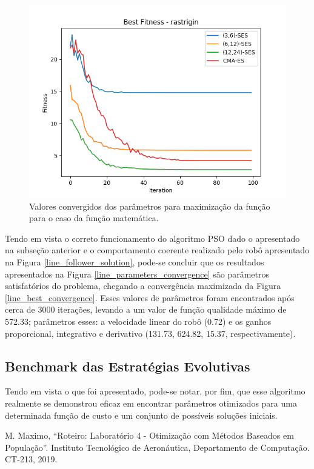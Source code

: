 \documentclass[conference]{IEEEtran}
\begin{document}
\begin{figure}[htbp]
\centering
\centerline{\includegraphics[scale=0.4]{imagens/rastrigin/best_fitness.png}}
\caption{Valores convergidos dos parâmetros para maximização da função para o caso da função matemática.}
\label{rastrigin/best_fitness}
\end{figure}

Tendo em vista o correto funcionamento do algoritmo PSO dado o apresentado na subseção anterior e o comportamento coerente realizado pelo robô apresentado na Figura \ref{line_follower_solution}, pode-se concluir que os resultados apresentados na Figura \ref{line_parameters_convergence} são parâmetros satisfatórios do problema, chegando a convergência maximizada da Figura \ref{line_best_convergence}. Esses valores de parâmetros foram encontrados após cerca de 3000 iterações, levando a um valor de função qualidade máximo de 572.33; parâmetros esses: a velocidade linear do robô (0.72) e os ganhos proporcional, integrativo e derivativo (131.73, 624.82, 15.37, respectivamente).

\subsection{Benchmark das Estratégias Evolutivas}

Tendo em vista o que foi apresentado, pode-se notar, por fim, que esse algoritmo realmente se demonstrou eficaz em encontrar parâmetros otimizados para uma determinada função de custo e um conjunto de possíveis soluções iniciais.

\begin{thebibliography}{00}
 M. Maximo, ``Roteiro: Laboratório 4 - Otimização com Métodos Baseados em População''. Instituto Tecnológico de Aeronáutica, Departamento de Computação. CT-213, 2019.
\end{thebibliography}
\end{document}
